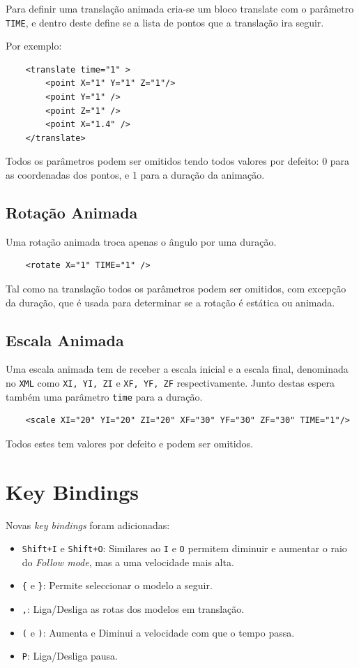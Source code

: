 \documentclass[a4paper]{article}
\begin{document}
Para definir uma translação animada cria-se um bloco translate com o parâmetro \texttt{TIME}, e dentro deste define se a lista de pontos que a translação ira seguir.

Por exemplo:
\begin{verbatim}
    <translate time="1" >
        <point X="1" Y="1" Z="1"/>
        <point Y="1" />
        <point Z="1" />
        <point X="1.4" />
    </translate>
\end{verbatim}

Todos os parâmetros podem ser omitidos tendo todos valores por defeito: 0 para as coordenadas dos pontos, e 1 para a duração da animação.

\subsection{Rotação Animada}

Uma rotação animada troca apenas o ângulo por uma duração.
\begin{verbatim}
    <rotate X="1" TIME="1" />
\end{verbatim}

Tal como na translação todos os parâmetros podem ser omitidos, com excepção da duração, que é usada para determinar se a rotação é estática ou animada.

\subsection{Escala Animada}

Uma escala animada tem de receber a escala inicial e a escala final, denominada no \texttt{XML} como \texttt{XI, YI, ZI} e \texttt{XF, YF, ZF} respectivamente. Junto destas espera também uma parâmetro \texttt{time} para a duração.

\begin{verbatim}
    <scale XI="20" YI="20" ZI="20" XF="30" YF="30" ZF="30" TIME="1"/>
\end{verbatim}

Todos estes tem valores por defeito e podem ser omitidos.

\section{Key Bindings}

Novas \textit{key bindings} foram adicionadas:

\begin{itemize}
    \item \texttt{Shift+I} e \texttt{Shift+O}: Similares ao \texttt{I} e
        \texttt{O} permitem diminuir e aumentar o raio do \textit{Follow mode},
        mas a uma velocidade mais alta.
    \item \verb!{! e \verb!}!: Permite seleccionar o modelo a seguir.
    \item \texttt{,}: Liga/Desliga as rotas dos modelos em translação.
    \item \verb!(! e \verb!)!: Aumenta e Diminui a velocidade com que o tempo
        passa.
    \item \texttt{P}: Liga/Desliga pausa.
\end{itemize}
\end{document}
